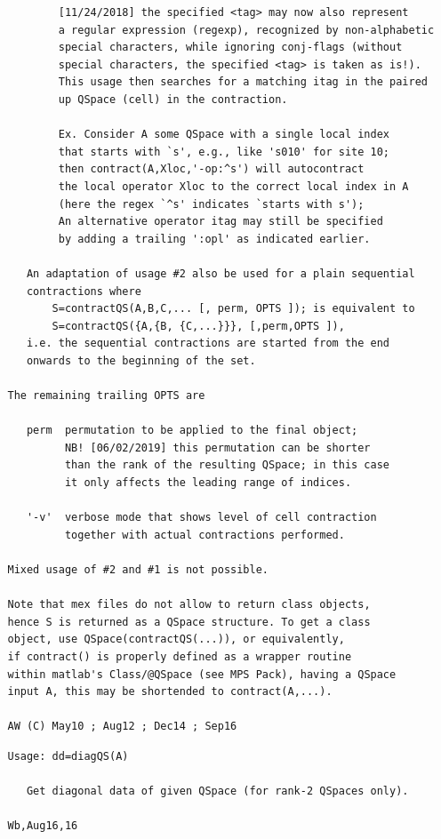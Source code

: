 \documentclass[twoside,12pt]{article}
\begin{document}
\begin{verbatim}
           [11/24/2018] the specified <tag> may now also represent
           a regular expression (regexp), recognized by non-alphabetic
           special characters, while ignoring conj-flags (without
           special characters, the specified <tag> is taken as is!).
           This usage then searches for a matching itag in the paired
           up QSpace (cell) in the contraction.
 
           Ex. Consider A some QSpace with a single local index
           that starts with `s', e.g., like 's010' for site 10;
           then contract(A,Xloc,'-op:^s') will autocontract
           the local operator Xloc to the correct local index in A
           (here the regex `^s' indicates `starts with s');
           An alternative operator itag may still be specified
           by adding a trailing ':opl' as indicated earlier.
 
      An adaptation of usage #2 also be used for a plain sequential
      contractions where
          S=contractQS(A,B,C,... [, perm, OPTS ]); is equivalent to
          S=contractQS({A,{B, {C,...}}}, [,perm,OPTS ]),
      i.e. the sequential contractions are started from the end
      onwards to the beginning of the set.
 
   The remaining trailing OPTS are
 
      perm  permutation to be applied to the final object;
            NB! [06/02/2019] this permutation can be shorter
            than the rank of the resulting QSpace; in this case
            it only affects the leading range of indices.
 
      '-v'  verbose mode that shows level of cell contraction
            together with actual contractions performed.
 
   Mixed usage of #2 and #1 is not possible.
 
   Note that mex files do not allow to return class objects,
   hence S is returned as a QSpace structure. To get a class
   object, use QSpace(contractQS(...)), or equivalently,
   if contract() is properly defined as a wrapper routine
   within matlab's Class/@QSpace (see MPS Pack), having a QSpace
   input A, this may be shortended to contract(A,...).
 
   AW (C) May10 ; Aug12 ; Dec14 ; Sep16
\end{verbatim}

\pagebreak[3]



\begin{verbatim}
   Usage: dd=diagQS(A)
 
      Get diagonal data of given QSpace (for rank-2 QSpaces only).
 
   Wb,Aug16,16
\end{verbatim}
\end{document}
